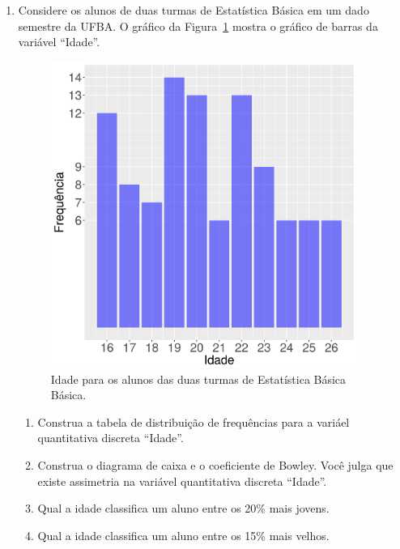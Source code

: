 \documentclass[12pt, a4paper]{article}
\begin{document}
\begin{enumerate}[1-]
	\item Considere os alunos de duas turmas de Estatística Básica em um dado semestre da UFBA. O gráfico da Figura~\ref{fig:idade_estat} mostra o gráfico de barras da variável ``Idade''.
	\begin{figure}[htbp]
		\centering
		\caption{Idade para os alunos das duas turmas de Estatística Básica Básica.}
		\label{fig:idade_estat}
		\includegraphics[width=10cm]{figure/Idade.png}
	\end{figure}
	\begin{enumerate}
		\item Construa a tabela de distribuição de frequências para a variáel quantitativa discreta ``Idade''.
		\item Construa o diagrama de caixa e o coeficiente de Bowley. Você julga que existe assimetria na variável quantitativa discreta ``Idade''.
		\item Qual a idade classifica um aluno entre os 20\% mais jovens.
		\item Qual a idade classifica um aluno entre os 15\% mais velhos.
	\end{enumerate}
	

\end{enumerate}
\end{document}
